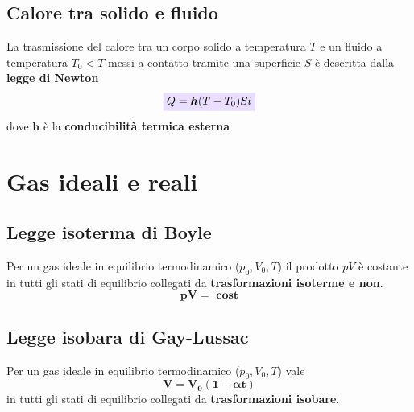 \documentclass[x11names]{report}
\newcommand{\viola}[1]{\colorbox{yred}{$\displaystyle #1$}}
\begin{document}
	\subsection{Calore tra solido e fluido}
	La trasmissione del calore tra un corpo solido a temperatura \(T\) e un fluido a temperatura \(T_0 < T\) messi a contatto tramite una superficie \(S\) è descritta dalla \textbf{legge di Newton}
	\begin{equation}
		\viola{Q = \boldsymbol{h}(T-T_0)St}
	\end{equation}
	dove \(\boldsymbol{h}\) è la \textbf{conducibilità termica esterna}
	
	\section{Gas ideali e reali}
	
	\begin{center}
		\colorbox{yred}{\begin{minipage}{5.75in}
				\begin{redes}{}
					\subsection{Legge isoterma di Boyle}
					Per un gas ideale in equilibrio termodinamico (\(p_{0}, V_{0}, T\)) il prodotto \(pV\) è costante  in tutti gli stati di equilibrio collegati da \textbf{trasformazioni isoterme e non}.
					\[ 
					\boldsymbol{pV = \text{ cost}}
					\]
				\end{redes}
		\end{minipage}}
	\end{center}
	
	\begin{center}
		\colorbox{yred}{\begin{minipage}{5.75in}
				\begin{redes}{}
					\subsection{Legge isobara di Gay-Lussac}
					Per un gas ideale in equilibrio termodinamico (\(p_{0}, V_{0}, T\)) vale
					\[ 
					\boldsymbol{V = V_0(1 + \alpha t)}
					\]
					in tutti gli stati di equilibrio collegati da \textbf{trasformazioni isobare}.
				\end{redes}
		\end{minipage}}
	\end{center}
	
\end{document}

